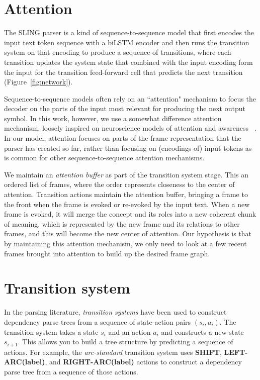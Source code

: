 \documentclass[11pt,a4paper]{article}
\begin{document}
\section{Attention}
\label{sec:att}

The SLING parser is a kind of sequence-to-sequence model that first encodes the
input text token sequence with a biLSTM encoder and then runs the transition
system on that encoding to produce a sequence of transitions, where each transition 
updates the system state that combined with the input encoding form the input for 
the transition feed-forward cell that predicts the next transition (Figure~\ref{fig:network}).

Sequence-to-sequence models often rely on an ``attention" mechanism to focus
the decoder on the parts of the input most relevant for producing the next output
symbol. In this work, however, we use a somewhat difference attention mechanism,
loosely inspired on neuroscience models of attention and awareness
~\cite{nelson2017,graziano2013}. In our model, attention focuses on parts of the frame
representation that the parser has created so far, rather than focusing on (encodings of)
input tokens as is common for other sequence-to-sequence attention mechanisms.

We maintain an \emph{attention buffer} as part of the transition system stage.
This an ordered list of frames, where the order represents closeness to the center
of attention. Transition actions maintain the attention buffer, bringing a frame
to the front when the frame
is evoked or re-evoked by the input text. When a new frame is evoked, it will
merge the concept and its roles into a new coherent chunk of meaning, which is
represented by the new frame and its relations to other frames, and this will
become the new center of attention. Our hypothesis is that by maintaining this
attention mechanism, we only need to look at a few recent frames brought into
attention to build up the desired frame graph.

\section{Transition system}
\label{sec:ts}

In the parsing literature, \emph{transition systems} have been
used to construct dependency parse trees from a sequence of state-action pairs
$(s_i,a_i)$. The transition system takes a state $s_i$ and an action $a_i$ and
constructs a new state $s_{i+1}$. This allows you to build a tree structure by
predicting a sequence of actions. For example, the \emph{arc-standard}
transition system \cite{nivre2006} uses {\bf SHIFT}, {\bf LEFT-ARC(label)}, and
{\bf RIGHT-ARC(label)} actions to construct a dependency parse tree from a
sequence of those actions.
\end{document}
